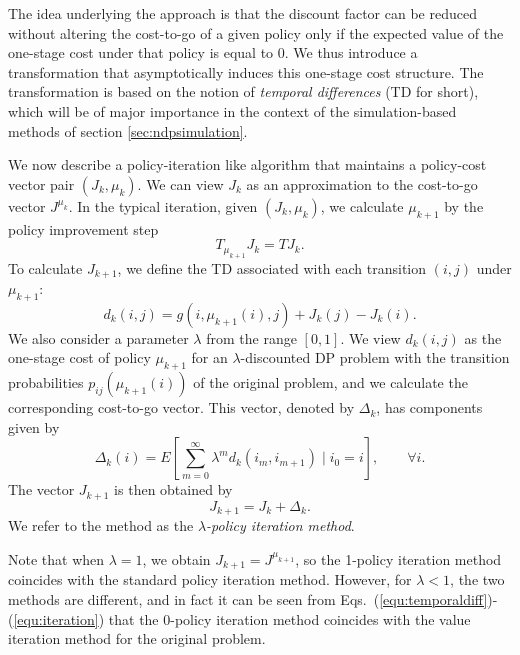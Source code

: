 The idea underlying the approach is that the discount factor can be reduced without altering the cost-to-go of a given policy only if the expected value of the one-stage cost under that policy is equal to 0. We thus introduce a transformation that asymptotically induces this one-stage cost structure. The transformation is based on the notion of \emph{temporal differences} (TD for short), which will be of major importance in the context of the simulation-based methods of section \ref{sec:ndpsimulation}.

We now describe a policy-iteration like algorithm that maintains a policy-cost vector pair $(J_k,\mu_k)$. We can view $J_k$ as an approximation to the cost-to-go vector $J^{\mu_k}$. In the typical iteration, given $(J_k,\mu_k)$, we calculate $\mu_{k+1}$ by the policy improvement step
$$T_{\mu_{k+1}}J_k = TJ_k.$$
To calculate $J_{k+1}$, we define the TD associated with each transition $(i,j)$ under $\mu_{k+1}$:
\begin{equation} \label{equ:temporaldiff}
d_k(i,j) = g(i,\mu_{k+1}(i),j) + J_k(j) - J_k(i).
\end{equation}
We also consider a parameter $\lambda$ from the range $[0,1]$. We view $d_k(i,j)$ as the one-stage cost of policy $\mu_{k+1}$ for an $\lambda$-discounted DP problem with the transition probabilities $p_{ij}\left(\mu_{k+1}(i)\right)$ of the original problem, and we calculate the corresponding cost-to-go vector. This vector, denoted by $\Delta_k$, has components given by
\begin{equation} \label{equ:deltak}
\Delta_k(i) = E\left[\sum^\infty_{m=0} \lambda^m d_k(i_m,i_{m+1}) \mid i_0 = i \right], \qquad \forall i.
\end{equation}
The vector $J_{k+1}$ is then obtained by
\begin{equation} \label{equ:iteration}
J_{k+1} = J_k + \Delta_k.
\end{equation}
We refer to the method as the \emph{$\lambda$-policy iteration method}.

Note that when $\lambda = 1$, we obtain $J_{k+1} = J^{\mu_{k+1}}$, so the 1-policy iteration method coincides with the standard policy iteration method. However, for $\lambda < 1$, the two methods are different, and in fact it can be seen from Eqs.\ (\ref{equ:temporaldiff})-(\ref{equ:iteration}) that the 0-policy iteration method coincides with the value iteration method for the original problem.

